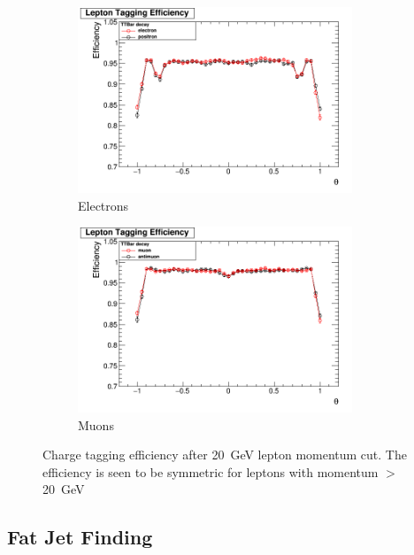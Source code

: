 \begin{figure}
  \centering
  \begin{subfigure}{.5\textwidth}
    \centering
    \includegraphics[width=0.9\textwidth]{TopAnalysis/figures/ElectronEfficiencys_20GeVCut.png}
    \caption[Charge Tagging Efficiency]{Electrons}
  \end{subfigure}%
  \begin{subfigure}{.5\textwidth}
    \centering
    \includegraphics[width=0.9\textwidth]{TopAnalysis/figures/MuonEfficiencys_20GeVMCCut.png}
    \caption[Charge Tagging Efficiency]{Muons}
  \end{subfigure}
  \caption[Charge Tagging Efficiency After 20GeV Lepton Momentum Cut]{Charge tagging efficiency after 20~GeV lepton momentum cut. The efficiency is seen to be symmetric for leptons with momentum $>$ 20~GeV}
  \label{fig:effienciesWithCuts}
\end{figure}


\subsection{Fat Jet Finding}


